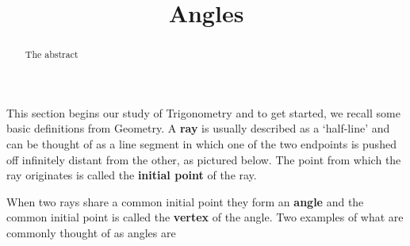 \documentclass[12pt]{ximera}
\title{Angles}
\begin{document}
\begin{abstract} 
The abstract
\end{abstract}

\maketitle

\setcounter{footnote}{0}

\label{Angles}

This section begins our study of Trigonometry and to get started, we recall some basic definitions from Geometry.  A  \textbf{ray} is usually described as a `half-line' and can be thought of as a line segment in which one of the two endpoints is pushed off infinitely distant from the other, as pictured below.  The point from which the ray originates is called the  \textbf{initial point} of the ray.

\begin{center}



\end{center}

When two rays share a common initial point they form an  \textbf{angle} and the common initial point is called the \textbf{vertex} of the angle.  Two  examples of what are commonly thought of as angles are

\[ \begin{array}{cc}

  

&

\hspace{1.75in}

   \\ \end{array} \]
\end{document}
